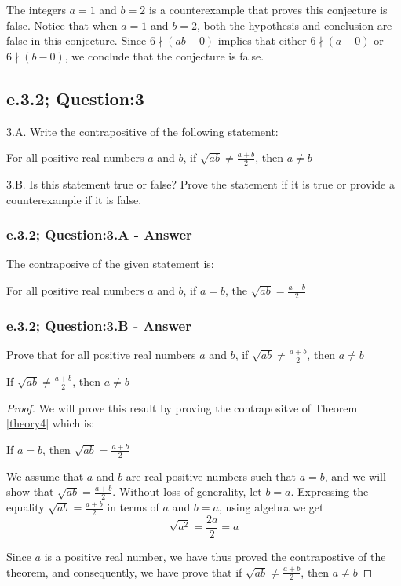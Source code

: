 The integers $a=1$ and $b=2$ is a counterexample that proves this conjecture is false. Notice that when $a=1$ and $b=2$, both the hypothesis and conclusion are false in this conjecture. Since $6 \nmid (ab - 0)$ implies  that either $6 \nmid (a + 0)$ or $6 \nmid (b - 0)$, we conclude that the conjecture is false.  




\subsection{e.3.2; Question:3}
3.A. Write the contrapositive of the following statement:\\
	\begin{center}
		For all positive real numbers $a$ and $b$, if $\sqrt{ab} \neq \frac{a+b}{2}$, then $a \neq b$
	\end{center}
3.B. Is this statement true or false? Prove the statement if it is true or provide a counterexample if it is false.

\subsubsection*{e.3.2; Question:3.A - Answer}
The contraposive of the given statement is: 	
	
	\begin{center}
		For all positive real numbers $a$ and $b$, if $a = b$, the $\sqrt{ab} = \frac{a+b}{2}$
	\end{center}


\subsubsection*{e.3.2; Question:3.B - Answer}
Prove that for all positive real numbers $a$ and $b$, if $\sqrt{ab} \neq \frac{a+b}{2}$, then $a \neq b$

\begin{tcolorbox}
	\begin{theorem}
	\label{theory4}
		If $\sqrt{ab} \neq \frac{a+b}{2}$, then $a \neq b$
	\end{theorem}
\end{tcolorbox}

\begin{proof}

We will prove this result by proving the contrapositve of Theorem \ref{theory4} which is:
	\begin{center}
		If $a = b$, then $\sqrt{ab} = \frac{a+b}{2}$
	\end{center}
We assume that $a$ and $b$ are real positive numbers such that $a=b$, and we will show that $\sqrt{ab} = \frac{a+b}{2}$. Without loss of generality, let $b=a$. Expressing the equality $\sqrt{ab} = \frac{a+b}{2}$ in terms of $a$ and $b=a$, using algebra we get
	\begin{equation}
		\sqrt{a^2} = \frac{2a}{2} = a	\nonumber
	\end{equation}

Since $a$ is a positive real number, we have thus proved the contrapostive of the theorem, and consequently, we have prove that if $\sqrt{ab} \neq \frac{a+b}{2}$, then $a \neq b$
\end{proof}


